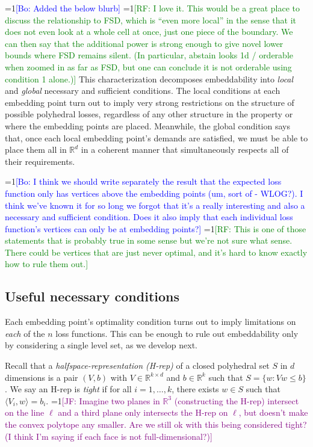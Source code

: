 \documentclass[anon,12pt]{colt2019}
\newcommand{\Comments}{1}
\newcommand{\mynote}[2]{\ifnum\Comments=1\textcolor{#1}{#2}\fi}
\newcommand{\raf}[1]{\mynote{green}{[RF: #1]}}
\newcommand{\jessie}[1]{\mynote{purple}{[JF: #1]}}
\newcommand{\bo}[1]{\mynote{blue}{[Bo: #1]}}
\newcommand{\reals}{\mathbb{R}}
\begin{document}
\bo{Added the below blurb}
\raf{I love it.  This would be a great place to discuss the relationship to FSD, which is ``even more local'' in the sense that it does not even look at a whole cell at once, just one piece of the boundary.  We can then say that the additional power is strong enough to give novel lower bounds where FSD remains silent.  (In particular, abstain looks 1d / orderable when zoomed in as far as FSD, but one can conclude it is not orderable using condition 1 alone.)}
This characterization decomposes embeddability into \emph{local} and \emph{global} necessary and sufficient conditions.
The local conditions at each embedding point turn out to imply very strong restrictions on the structure of possible polyhedral losses, regardless of any other structure in the property or where the embedding points are placed.
Meanwhile, the global condition says that, once each local embedding point's demands are satisfied, we must be able to place them all in $\reals^d$ in a coherent manner that simultaneously respects all of their requirements.

\bo{I think we should write separately the result that the expected loss function only has vertices above the embedding points (um, sort of - WLOG?). I think we've known it for so long we forgot that it's a really interesting and also a necessary and sufficient condition. Does it also imply that each individual loss function's vertices can only be at embedding points?}
\raf{This is one of those statements that is probably true in some sense but we're not sure what sense.  There could be vertices that are just never optimal, and it's hard to know exactly how to rule them out.}

\subsection{Useful necessary conditions}

Each embedding point's optimality condition turns out to imply limitations on \emph{each} of the $n$ loss functions.
This can be enough to rule out embeddability only by considering a single level set, as we develop next.

Recall that a \emph{halfspace-representation (H-rep)} of a closed polyhedral set $S$ in $d$ dimensions is a pair $(V,b)$ with $V \in \reals^{k \times d}$ and $b \in \reals^k$ such that $S = \{ w : Vw \leq b \}$.
We say an H-rep is \emph{tight} if for all $i=1,\dots,k$, there exists $w \in S$ such that $\langle V_i , w \rangle = b_i$.
\jessie{Imagine two planes in $\reals^3$ (constructing the H-rep) intersect on the line $\ell$ and a third plane only intersects the H-rep on $\ell$, but doesn't make the convex polytope any smaller.  Are we still ok with this being considered tight?  (I think I'm saying if each face is not full-dimensional?)}
\end{document}
